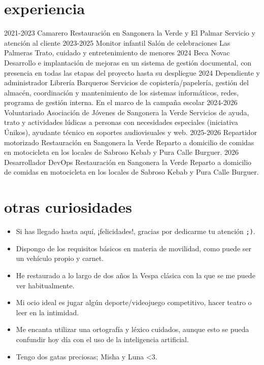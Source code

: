 \documentclass[]{twentysecondcv}
\begin{document}
\section{experiencia}
\begin{twenty}
  \twentyitem
    {2021-2023}
    {Camarero}
    {Restauración en Sangonera la Verde y El Palmar}
    {Servicio y atención al cliente}
  \twentyitem
    {2023-2025}
    {Monitor infantil}
    {Salón de celebraciones Las Palmeras}
    {Trato, cuidado y entretenimiento de menores}
\twentyitem
    {2024}
    {Beca }
    {Novac}
    {Desarrollo e implantación de mejoras en un sistema de gestión documental, con presencia en todas las etapas del proyecto hasta su despliegue}
\twentyitem
    {2024}
    {Dependiente y administrador}
    {Librería Barqueros}
    {Servicios de copistería/papelería, gestión del almacén, coordinación y mantenimiento de los sistemas informáticos, redes, programa de gestión interna. En el marco de la campaña escolar}
\twentyitem
    {2024-2026}
    {Voluntariado}
    {Asociación de Jóvenes de Sangonera la Verde}
    {Servicios de ayuda, trato y actividades lúdicas a personas con necesidades especiales (iniciativa Únikos), ayudante técnico en soportes audiovisuales y web.}
\twentyitem
    {2025-2026}
    {Repartidor motorizado}
    {Restauración en Sangonera la Verde}
    {Reparto a domicilio de comidas en motocicleta en los locales de Sabroso Kebab y Pura Calle Burguer.}
  \twentyitem
    {2026}
    {Desarrollador DevOps}
    {Restauración en Sangonera la Verde}
    {Reparto a domicilio de comidas en motocicleta en los locales de Sabroso Kebab y Pura Calle Burguer.}
\end{twenty}

\section{otras curiosidades}
  \begin{itemize}
    \item Si has llegado hasta aquí, ¡felicidades!, gracias por dedicarme tu atención \texttt{;)}.
    \item Dispongo de los requisitos básicos en materia de movilidad, como puede ser un vehículo propio y carnet. 
    \item He restaurado a lo largo de dos años la Vespa clásica con la que se me puede ver habitualmente.
    \item Mi ocio ideal es jugar algún deporte/videojuego competitivo, hacer teatro o leer en la intimidad.
    \item Me encanta utilizar una ortografía y léxico cuidados, aunque esto se pueda confundir hoy día con el uso de la inteligencia artificial.
    \item Tengo dos gatas preciosas; Misha y Luna <3.
  \end{itemize}
  

\end{document}
